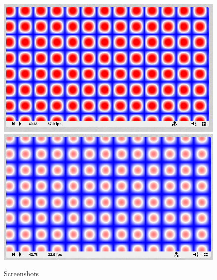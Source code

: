 \documentclass[a4paper]{article}
\begin{document}
\begin{figure}[!ht]
	\centering
	\includegraphics[width=0.7\linewidth]{Screenshot-2019-06-04_142043}
	\includegraphics[width=0.7\linewidth]{Screenshot-2019-06-04_142159}
	\caption{Screenshots}
	\label{fig:screenshot-2019-06-04142043}
\end{figure}
\end{document}
